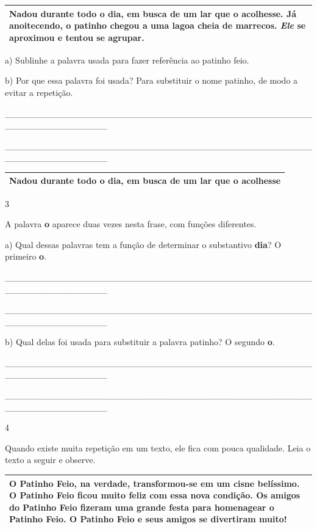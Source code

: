 \begin{escolha}
\begin{longtable}[]{@{}l@{}}
\begin{minipage}[t]{0.97\columnwidth}
Nadou durante todo o dia, em busca de um lar que o acolhesse. Já
anoitecendo, o patinho chegou a uma lagoa cheia de marrecos. \emph{Ele}
se aproximou e tentou se agrupar.\strut
\end{minipage}\tabularnewline
\bottomrule
\end{longtable}

a) Sublinhe a palavra usada para fazer referência ao patinho feio.

b) Por que essa palavra foi usada? Para substituir o nome patinho, de
modo a evitar a repetição.

\_\_\_\_\_\_\_\_\_\_\_\_\_\_\_\_\_\_\_\_\_\_\_\_\_\_\_\_\_\_\_\_\_\_\_\_\_\_\_\_\_\_\_\_\_\_\_\_\_\_\_\_\_\_\_\_\_\_\_\_\_\_\_\_

\_\_\_\_\_\_\_\_\_\_\_\_\_\_\_\_\_\_\_\_\_\_\_\_\_\_\_\_\_\_\_\_\_\_\_\_\_\_\_\_\_\_\_\_\_\_\_\_\_\_\_\_\_\_\_\_\_\_\_\_\_\_\_\_

\begin{longtable}[]{@{}l@{}}
\toprule
Nadou durante todo o dia, em busca de um lar que o
acolhesse\tabularnewline
\bottomrule
\end{longtable}

\num{3}

A palavra \textbf{o} aparece duas vezes nesta frase, com funções
diferentes.

a) Qual dessas palavras tem a função de determinar o substantivo
\textbf{dia}? O primeiro \textbf{o}.

\_\_\_\_\_\_\_\_\_\_\_\_\_\_\_\_\_\_\_\_\_\_\_\_\_\_\_\_\_\_\_\_\_\_\_\_\_\_\_\_\_\_\_\_\_\_\_\_\_\_\_\_\_\_\_\_\_\_\_\_\_\_\_\_

\_\_\_\_\_\_\_\_\_\_\_\_\_\_\_\_\_\_\_\_\_\_\_\_\_\_\_\_\_\_\_\_\_\_\_\_\_\_\_\_\_\_\_\_\_\_\_\_\_\_\_\_\_\_\_\_\_\_\_\_\_\_\_\_

b) Qual delas foi usada para substituir a palavra patinho? O segundo
\textbf{o}.

\_\_\_\_\_\_\_\_\_\_\_\_\_\_\_\_\_\_\_\_\_\_\_\_\_\_\_\_\_\_\_\_\_\_\_\_\_\_\_\_\_\_\_\_\_\_\_\_\_\_\_\_\_\_\_\_\_\_\_\_\_\_\_\_

\_\_\_\_\_\_\_\_\_\_\_\_\_\_\_\_\_\_\_\_\_\_\_\_\_\_\_\_\_\_\_\_\_\_\_\_\_\_\_\_\_\_\_\_\_\_\_\_\_\_\_\_\_\_\_\_\_\_\_\_\_\_\_\_

\num{4}

Quando existe muita repetição em um texto, ele fica com pouca qualidade.
Leia o texto a seguir e observe.

\begin{longtable}[]{@{}l@{}}
\toprule
O \textbf{Patinho Feio}, na verdade, transformou-se em um cisne
belíssimo. O \textbf{Patinho Feio} ficou muito feliz com essa nova
condição. Os amigos do \textbf{Patinho Feio} fizeram uma grande festa
para homenagear o \textbf{Patinho Feio}. \textbf{O Patinho Feio e seus
amigos} se divertiram muito!\tabularnewline
\bottomrule
\end{longtable}


\end{escolha}
